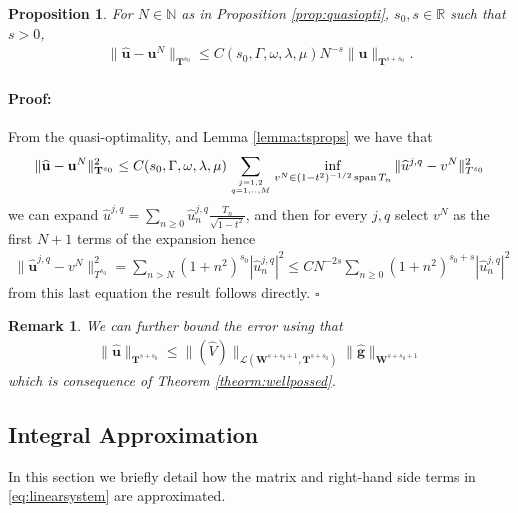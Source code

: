 \documentclass{article}
\newtheorem{proposition}[theorem]{Proposition}
\newtheorem{remark}[theorem]{Remark}
\newenvironment{proof}{\paragraph{Proof:}}{\hfill$\square$}
\newcommand{\IN}{{\mathbb N}}
\newcommand{\IR}{{\mathbb R}}
\DeclareMathOperator{\spn}{span}
\begin{document}
\begin{proposition}
\label{prop:demidisconv}
For $N \in \IN$ as in Proposition \ref{prop:quasiopti}, $s_0, s \in \IR$ such that $s>0$, 
\begin{align}
\| \widehat{\mathbf{u}} - \mathbf{u}^N \|_{\mathbf{T}^{s_0}}  \leq C(s_0, \Gamma,\omega, \lambda, \mu) N^{-s} \| \widehat{\mathbf{u}}\|_{\mathbf{T}^{s+s_0}}.
\end{align}
\end{proposition}
\begin{proof}
From the quasi-optimality, and Lemma \ref{lemma:tsprops} we have that 
\begin{align*}
\| \widehat{\mathbf{u}} - \mathbf{u}^N \|_{\mathbf{T}^{s_0}}^2  \leq C(s_0,\Gamma, \omega, \lambda, \mu) \sum_{ j = 1,2 \atop q = 1,..,M} \inf_{v^N \in (1-t^2)^{-1/2}\spn T_n} \| \widehat{u}^{j,q} - v^N \|^2_{T^{s_0}}
\end{align*}
we can expand $\widehat{u}^{j,q} = \sum_{n \geq  0 } \widehat{u}^{j,q}_n \frac{T_n}{\sqrt{1-t^2}}$, and then for every $j,q$ select $v^N$ as the first $N+1$ terms of the expansion hence 
\begin{align*}
\| \widehat{\mathbf{u}}^{j,q} - v^N \|^2_{T^{s_0}}  = \sum_{n > N} (1+n^2)^{s_0} |\widehat{u}^{j,q}_n|^2 \leq C N^{-2s} \sum_{n \geq 0} (1+n^2)^{s_0+s} |\widehat{u}^{j,q}_n|^2
\end{align*}
from this last equation the result follows directly. 
\end{proof}

\begin{remark}
\label{rem:utsnorm}
We can further bound the error using that 
\begin{align*}
\| \widehat{\mathbf{u}}\|_{\mathbf{T}^{s+s_0}} \leq \| (\widehat{V})\|_{\mathcal{L}(\mathbf{W}^{s+s_0+1},\mathbf{T}^{s+s_0})} \| \widehat{\mathbf{g}} \|_{\mathbf{W}^{s+s_0+1}}
\end{align*}
 which is consequence of Theorem \ref{theorm:wellpossed}.
\end{remark}

\subsection{Integral Approximation}

In this section we briefly detail how the matrix and right-hand side terms in \eqref{eq:linearsystem} are approximated.
\end{document}
